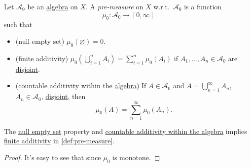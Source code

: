 \begin{definition}\label{def:pre-measure}
	Let \(\mathcal{A} _0\) be an \hyperref[def:algebra]{algebra} on \(X\). A \emph{pre-measure} on \(X\) w.r.t.\ \(\mathcal{A} _0\) is a function
	\[
		\mu_0 \colon \mathcal{A} _0\to [0, \infty ]
	\]
	such that
	\begin{itemize}
		\item\label{def:pre-measure-null-empty-set}(null empty set) \(\mu_0(\varnothing ) = 0\).
		\item\label{def:pre-measure-finite-additivity}(finite additivity) \(\mu_0\left(\bigcup_{i=1}^{n} A_{i}\right) = \sum_{i=1}^{n} \mu_0(A_{i})\) if
		      \(A_1, \dots , A_n\in \mathcal{A} _0 \) are \underline{disjoint}.
		\item\label{def:pre-measure-countable-additivity-within-the-algebra}(countable additivity within the \hyperref[def:algebra]{algebra}) If \(A\in\mathcal{A} _0\) and \(A = \bigcup_{n=1}^{\infty} A_{n}\), \(A_n\in\mathcal{A} _0\), \underline{disjoint}, then
		      \[
			      \mu_0(A) = \sum_{n=1}^{\infty} \mu_0(A_{n}).
		      \]
	\end{itemize}
\end{definition}

\begin{lemma}
	The \hyperref[def:pre-measure-null-empty-set]{null empty set} property and \hyperref[def:pre-measure-countable-additivity-within-the-algebra]{countable additivity within the \hyperref[def:algebra]{algebra}} implies \hyperref[def:pre-measure-finite-additivity]{finite additivity} in \autoref{def:pre-measure}.
\end{lemma}
\begin{proof}
	It's easy to see that since \(\mu _0\) is monotone.
\end{proof}

